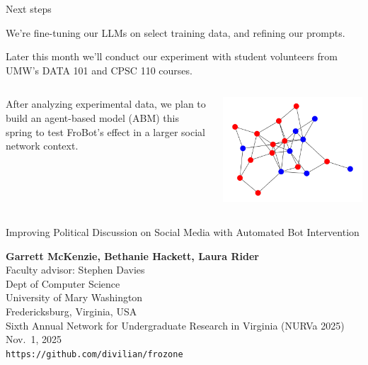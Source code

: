 \documentclass[12pt]{beamer}
\begin{document}
\begin{frame}[c]{Next steps}

We're fine-tuning our LLMs on select training data, and refining our prompts.

\pause
Later this month we'll conduct our experiment with student volunteers from UMW's DATA 101 and CPSC 110 courses.
\pause


\begin{columns}[c,onlytextwidth]
  \begin{column}{0.6\textwidth}
After analyzing experimental data, we plan to build an agent-based model (ABM) this spring to test FroBot's effect in a larger social network context.
  \end{column}
  \begin{column}{0.4\textwidth}
    \includegraphics[width=\linewidth]{agraph.png}
  \end{column}
\end{columns}

\end{frame}
\begin{frame}[c]{}

\begin{center}
\Large

Improving Political Discussion on Social Media
with Automated Bot Intervention

\footnotesize
\textbf{Garrett McKenzie, Bethanie Hackett, Laura Rider}\\
\smallskip
\scriptsize
Faculty advisor: Stephen Davies \\
\medskip
Dept of Computer Science\\
University of Mary Washington\\
Fredericksburg, Virginia, USA\\
\bigskip
\bigskip
\scriptsize
Sixth Annual Network for Undergraduate Research in Virginia (NURVa 2025)\\
\bigskip
\scriptsize
Nov.~1, 2025\\
\texttt{https://github.com/divilian/frozone}
\end{center}

\end{frame}
\end{document}
